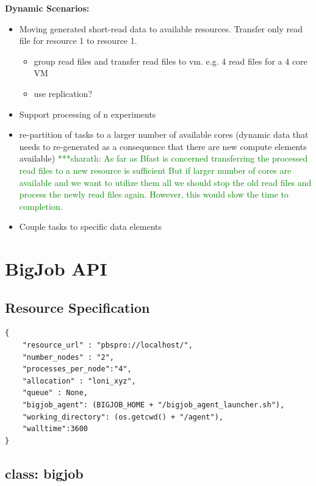 \documentclass[]{article}
\newcommand{\smnote}[1]{ {\textcolor{green} { ***sharath: #1 }}}
\newcommand{\smnote}[1]{}
\begin{document}
\noindent
\textbf{Dynamic Scenarios:}
\begin{itemize}
	\item Moving generated short-read data to available resources. Transfer only 
	read file for resource 1 to resource 1.
	\begin{itemize}
	   \item group read files and transfer read files to vm. e.g. 4 read files for a 4 core VM
	   \item use replication?
	\end{itemize}
	
	\item Support processing of n experiments 

	\item re-partition of tasks to a larger number of available cores (dynamic 
	data that needs to re-generated as a consequence that there are new compute 
	elements available)
	\smnote{ As far as Bfast is concerned transferring the processed read files to a new resource is sufficient
	But if larger number of cores are available and we want to utilize them all we should stop the old read files and process the newly read files again. However, this would slow the time to completion.}
	
	

    \item Couple tasks to specific data elements
\end{itemize}

\section{BigJob API}
\label{sec:api}
\subsection{Resource Specification}


\begin{verbatim}
{
    "resource_url" : "pbspro://localhost/", 
    "number_nodes" : "2", 
    "processes_per_node":"4", 
    "allocation" : "loni_xyz", 
    "queue" : None, 
    "bigjob_agent": (BIGJOB_HOME + "/bigjob_agent_launcher.sh"), 
    "working_directory": (os.getcwd() + "/agent"), 
    "walltime":3600 
}
\end{verbatim}


\subsection{class: bigjob}
\end{document}
